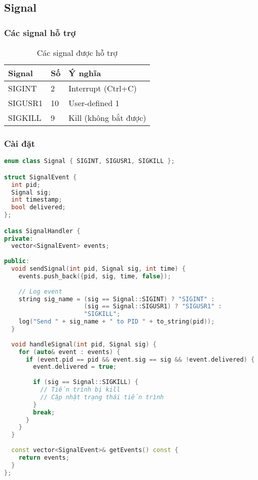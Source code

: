 \subsection{Signal}

\subsubsection{Các signal hỗ trợ}

\begin{table}[H]
\centering
\caption{Các signal được hỗ trợ}
\begin{tabular}{lll}
\toprule
\textbf{Signal} & \textbf{Số} & \textbf{Ý nghĩa} \\
\midrule
SIGINT & 2 & Interrupt (Ctrl+C) \\
SIGUSR1 & 10 & User-defined 1 \\
SIGKILL & 9 & Kill (không bắt được) \\
\bottomrule
\end{tabular}
\end{table}

\subsubsection{Cài đặt}

\begin{lstlisting}[language=C++,caption={Signal handling}]
enum class Signal { SIGINT, SIGUSR1, SIGKILL };

struct SignalEvent {
  int pid;
  Signal sig;
  int timestamp;
  bool delivered;
};

class SignalHandler {
private:
  vector<SignalEvent> events;
  
public:
  void sendSignal(int pid, Signal sig, int time) {
    events.push_back({pid, sig, time, false});
    
    // Log event
    string sig_name = (sig == Signal::SIGINT) ? "SIGINT" :
                      (sig == Signal::SIGUSR1) ? "SIGUSR1" :
                      "SIGKILL";
    log("Send " + sig_name + " to PID " + to_string(pid));
  }
  
  void handleSignal(int pid, Signal sig) {
    for (auto& event : events) {
      if (event.pid == pid && event.sig == sig && !event.delivered) {
        event.delivered = true;
        
        if (sig == Signal::SIGKILL) {
          // Tiến trình bị kill
          // Cập nhật trạng thái tiến trình
        }
        break;
      }
    }
  }
  
  const vector<SignalEvent>& getEvents() const {
    return events;
  }
};
\end{lstlisting}

